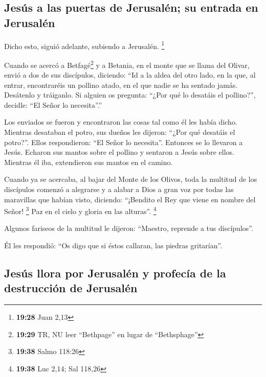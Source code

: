\hypertarget{jesuxfas-a-las-puertas-de-jerusaluxe9n-su-entrada-en-jerusaluxe9n}{%
\subsection{Jesús a las puertas de Jerusalén; su entrada en
Jerusalén}\label{jesuxfas-a-las-puertas-de-jerusaluxe9n-su-entrada-en-jerusaluxe9n}}

 Dicho esto, siguió adelante, subiendo a Jerusalén.
\footnote{\textbf{19:28} Juan 2,13}

 Cuando se acercó a Betfagé\footnote{\textbf{19:29} TR,
  NU leer ``Bethpage'' en lugar de ``Bethsphage''} y a Betania, en el
monte que se llama del Olivar, envió a dos de sus discípulos,
 diciendo: ``Id a la aldea del otro lado, en la que, al
entrar, encontraréis un pollino atado, en el que nadie se ha sentado
jamás. Desátenlo y tráiganlo.  Si alguien os pregunta:
``¿Por qué lo desatáis el pollino?'', decidle: ``El Señor lo
necesita''.''

 Los enviados se fueron y encontraron las cosas tal como
él les había dicho.  Mientras desataban el potro, sus
dueños les dijeron: ``¿Por qué desatáis el potro?''. 
Ellos respondieron: ``El Señor lo necesita''.  Entonces
se lo llevaron a Jesús. Echaron sus mantos sobre el pollino y sentaron a
Jesús sobre ellos.  Mientras él iba, extendieron sus
mantos en el camino.

 Cuando ya se acercaba, al bajar del Monte de los Olivos,
toda la multitud de los discípulos comenzó a alegrarse y a alabar a Dios
a gran voz por todas las maravillas que habían visto, 
diciendo: ``¡Bendito el Rey que viene en nombre del Señor! \footnote{\textbf{19:38}
  Salmo 118:26} Paz en el cielo y gloria en las alturas''. \footnote{\textbf{19:38}
  Luc 2,14; Sal 118,26}

 Algunos fariseos de la multitud le dijeron: ``Maestro,
reprende a tus discípulos''.

 Él les respondió: ``Os digo que si éstos callaran, las
piedras gritarían''.

\hypertarget{jesuxfas-llora-por-jerusaluxe9n-y-profecuxeda-de-la-destrucciuxf3n-de-jerusaluxe9n}{%
\subsection{Jesús llora por Jerusalén y profecía de la destrucción de
Jerusalén}\label{jesuxfas-llora-por-jerusaluxe9n-y-profecuxeda-de-la-destrucciuxf3n-de-jerusaluxe9n}}

